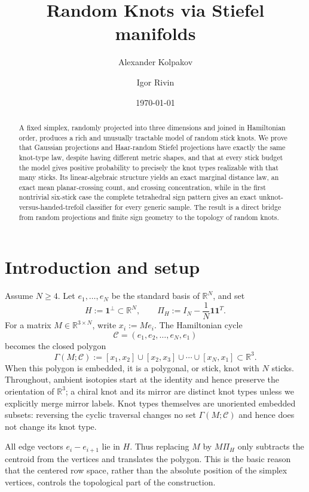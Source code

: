 \documentclass[11pt]{amsart}
\title{Random Knots via Stiefel manifolds}
\author{Alexander Kolpakov}
\author{Igor Rivin}
\date{\today}
\theoremstyle{remark}
\newcommand{\Rbb}{\mathbb{R}}
\newcommand{\1}{\mathbf{1}}
\begin{document}
\begin{abstract}
A fixed simplex, randomly projected into three dimensions and joined in
Hamiltonian order, produces a rich and unusually tractable model of random
stick knots.  We prove that Gaussian projections and Haar-random Stiefel
projections have exactly the same knot-type law, despite having different
metric shapes, and that at every stick budget the model gives positive
probability to precisely the knot types realizable with that many sticks.  Its
linear-algebraic structure yields an exact marginal distance law, an exact mean
planar-crossing count, and crossing concentration, while in the first
nontrivial six-stick case the complete tetrahedral sign pattern gives an exact
unknot-versus-handed-trefoil classifier for every generic sample.  The result
is a direct bridge from random projections and finite sign geometry to the
topology of random knots.
\end{abstract}

\maketitle

\section{Introduction and setup}

Assume \(N\ge4\).  Let \(e_1,\dots,e_N\) be the standard basis of \(\Rbb^N\), and set
\[
H:=\1^\perp\subset \Rbb^N,\qquad
\Pi_H:=I_N-\frac1N\1\1^T .
\]
For a matrix \(M\in\Rbb^{3\times N}\), write \(x_i:=Me_i\).  The Hamiltonian
cycle
\[
\mathcal C=(e_1,e_2,\dots,e_N,e_1)
\]
becomes the closed polygon
\[
\Gamma(M;\mathcal C)
:=
[x_1,x_2]\cup [x_2,x_3]\cup\cdots\cup[x_N,x_1]\subset\Rbb^3 .
\]
When this polygon is embedded, it is a polygonal, or stick, knot with \(N\) sticks.
Throughout, ambient isotopies start at the identity and hence preserve the orientation
of \(\Rbb^3\); a chiral knot and its mirror are distinct knot types unless we explicitly
merge mirror labels.  Knot types themselves are unoriented embedded subsets:
reversing the cyclic traversal changes no set \(\Gamma(M;\mathcal C)\) and hence
does not change its knot type.

All edge vectors \(e_i-e_{i+1}\) lie in \(H\).  Thus replacing \(M\) by
\(M\Pi_H\) only subtracts the centroid from the vertices and translates the polygon.  This is
the basic reason that the centered row space, rather than the absolute position of the
simplex vertices, controls the topological part of the construction.
\end{document}
